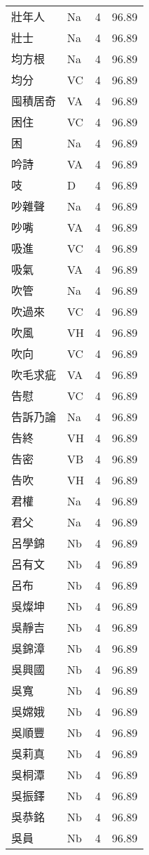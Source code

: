 \documentclass[twocolumn]{book}
\begin{document}
\begin{supertabular}{llrr}
壯年人 & Na & 4 &  96.89\\
壯士 & Na & 4 &  96.89\\
均方根 & Na & 4 &  96.89\\
均分 & VC & 4 &  96.89\\
囤積居奇 & VA & 4 &  96.89\\
困住 & VC & 4 &  96.89\\
困 & Na & 4 &  96.89\\
吟詩 & VA & 4 &  96.89\\
吱 & D & 4 &  96.89\\
吵雜聲 & Na & 4 &  96.89\\
吵嘴 & VA & 4 &  96.89\\
吸進 & VC & 4 &  96.89\\
吸氣 & VA & 4 &  96.89\\
吹管 & Na & 4 &  96.89\\
吹過來 & VC & 4 &  96.89\\
吹風 & VH & 4 &  96.89\\
吹向 & VC & 4 &  96.89\\
吹毛求疵 & VA & 4 &  96.89\\
告慰 & VC & 4 &  96.89\\
告訴乃論 & Na & 4 &  96.89\\
告終 & VH & 4 &  96.89\\
告密 & VB & 4 &  96.89\\
告吹 & VH & 4 &  96.89\\
君權 & Na & 4 &  96.89\\
君父 & Na & 4 &  96.89\\
呂學錦 & Nb & 4 &  96.89\\
呂有文 & Nb & 4 &  96.89\\
呂布 & Nb & 4 &  96.89\\
吳燦坤 & Nb & 4 &  96.89\\
吳靜吉 & Nb & 4 &  96.89\\
吳錦漳 & Nb & 4 &  96.89\\
吳興國 & Nb & 4 &  96.89\\
吳寬 & Nb & 4 &  96.89\\
吳嫦娥 & Nb & 4 &  96.89\\
吳順豐 & Nb & 4 &  96.89\\
吳莉真 & Nb & 4 &  96.89\\
吳桐潭 & Nb & 4 &  96.89\\
吳振鐸 & Nb & 4 &  96.89\\
吳恭銘 & Nb & 4 &  96.89\\
吳員 & Nb & 4 &  96.89\\

\end{supertabular}
\end{document}
